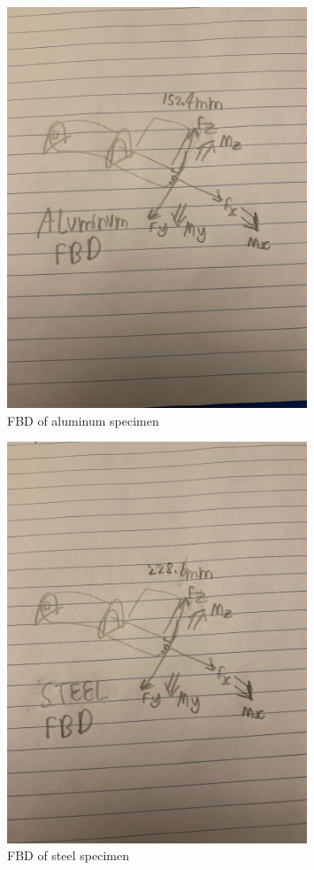 \documentclass[12pt, titlepage]{article}
\begin{document}
\begin{figure}[H]
    \centering
    \includegraphics[width=0.8\textwidth]{./Images/FBDA.jpeg}
    \captionsetup{justification=raggedright,singlelinecheck=false}
    \caption{FBD of aluminum specimen}
    \label{fig:alu_fbd}
\end{figure}
\begin{figure}[H]
    \centering
    \includegraphics[width=0.8\textwidth]{./Images/FBDS.jpeg}
    \captionsetup{justification=raggedright,singlelinecheck=false}
    \caption{FBD of steel specimen}
    \label{fig:steel_fbd}
\end{figure}
\newpage
\end{document}
